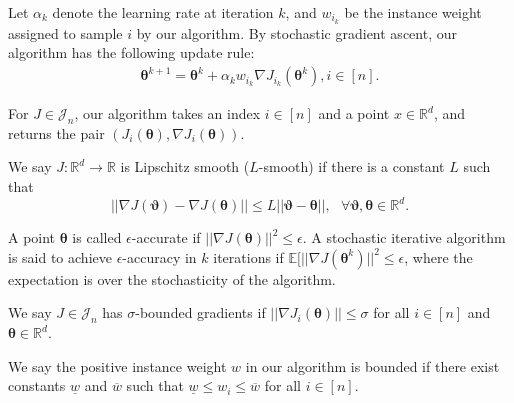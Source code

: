 Let $\alpha_k$ denote the learning rate at iteration $k$, and $w_{i_k}$ be the instance weight assigned to sample $i$ by our algorithm.
By stochastic gradient ascent, our algorithm has the following update rule:
\begin{eqnarray}
\bm{\theta}^{k+1} = \bm{\theta}^k + \alpha_kw_{i_k}\nabla J_{i_k}(\bm{\theta}^k), i\in [n].
\label{iter}
\end{eqnarray}


\begin{definition}
For $J\in\mathcal{J}_n$, our algorithm takes an index $i\in[n]$ and a point $x\in\mathbb{R}^d$, and returns the pair $(J_i(\bm{\theta}),\nabla J_i(\bm{\theta}))$.
\end{definition}

\begin{definition}
We say $J:\mathbb{R}^d\to \mathbb{R}$ is Lipschitz smooth ($L$-smooth) if there is a constant $L$ such that
\begin{equation}
||\nabla J(\bm{\vartheta}) - \nabla J(\bm{\theta})||\le L||\bm{\vartheta}-\bm{\theta}||,~~~\forall \bm{\vartheta},\bm{\theta}\in \mathbb{R}^d.
\end{equation}
\end{definition}

\begin{definition}
A point $\bm{\theta}$ is called $\epsilon$-accurate if $||\nabla J(\bm{\theta})||^2\le\epsilon$.
A stochastic iterative algorithm is said to achieve $\epsilon$-accuracy in $k$ iterations if $\mathbb{E}[||\nabla J(\bm{\theta}^k)||^2\le \epsilon$, where the expectation is over the stochasticity of the algorithm.
\end{definition}

\begin{definition}
We say $J\in\mathcal{J}_n$ has $\sigma$-bounded gradients if $||\nabla J_i(\bm{\theta})||\le\sigma$ for all $i\in[n]$ and $\bm{\theta}\in\mathbb{R}^d$.
\label{bound}
\end{definition}


\begin{definition}
We say the positive instance weight $w$ in our algorithm is bounded if there exist constants $\underline{w}$ and $\overline{w}$ such that $\underline{w}\le w_i \le \overline{w}$ for all $i\in[n]$.
\label{iw}
\end{definition}


